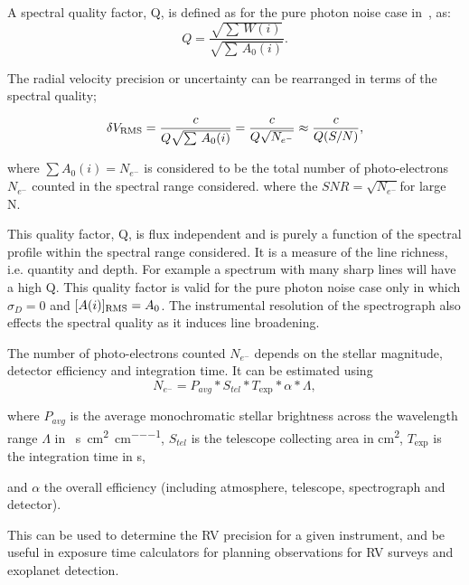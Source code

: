 A spectral quality factor, Q, is defined as for the pure photon noise case in~\cite{connes_absolute_1985, connes_demonstration_1996}, as:
\begin{equation}
Q = \frac{\sqrt{\sum{\,W(i)}}}{\sqrt{\sum{\,A_0(i)}}}.
\end{equation}

The radial velocity precision or uncertainty can be rearranged in terms of the spectral quality;

\begin{equation}
    \delta V_{\textrm{RMS}} = \frac{c}{Q \sqrt{\sum {\,A_0(i)}}} = \frac{c}{Q \sqrt{{N}_{{e}^{-}}}} \approx \frac{c}{Q (S/N)},
\end{equation}

where \(\sum A_0(i) = {N}_{{e}^{-}}\) is considered to be the total number of photo-electrons \({N}_{{e}^{-}}\) counted in the spectral range considered.
where the \({SNR}=\sqrt{N_{e^-}}\)for large N. 


This quality factor, Q, is flux independent and is purely a function of the spectral profile within the spectral range considered. It is a measure of the line richness, i.e. quantity and depth. For example a spectrum with many sharp lines will have a high Q. This quality factor is valid for the pure photon noise case only in which \(\sigma_{D} =0\) and \([A(i)]_{\textrm{RMS}} = A_0\). The instrumental resolution of the spectrograph also effects the spectral quality as it induces line broadening.

The number of photo-electrons counted \(N_{e^{-}}\) depends on the stellar magnitude, detector efficiency and integration time. It can be estimated using
 \begin{equation}
 N_{e^{-}} = P_{avg} * S_{tel} * T_{\textrm{exp}} * \alpha* \Lambda,
 \end{equation}

where \(P_{avg}\) is the average monochromatic stellar brightness
across the wavelength range \(\Lambda\) in \si{\photons\per\second\per\centi\metre\squared\per\centi\metre},
\(S_{tel}\) is the telescope collecting area in \si{\centi\metre\squared},
\(T_{\textrm{exp}}\) is the integration time in \si{\second},

and \(\alpha\) the overall efficiency (including atmosphere, telescope, spectrograph and detector).

This can be used to determine the {RV} precision for a given instrument, and be useful in exposure time calculators for planning observations for RV surveys and exoplanet detection.

